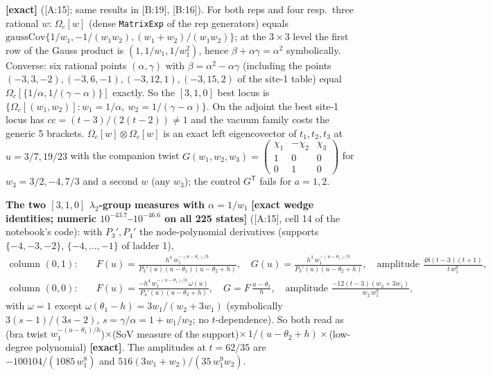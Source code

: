 \documentclass[10pt]{article}
\newcommand{\cl}[2]{\textsf{[#1:#2]}}
\newcommand{\tg}[1]{\textbf{[#1]}}
\newcommand{\Om}{\Omega}
\begin{document}
\tg{exact} (\cl{A}{15}; same results in \cl{B}{19}, \cl{B}{16}). For both reps and four resp.\ three rational $w$: $\Om_c[w]$ (dense \texttt{MatrixExp} of the rep generators) equals $\mathrm{gaussCov}\{1/w_1,-1/(w_1w_2),(w_1+w_2)/(w_1w_2)\}$; at the $3\times3$ level the first row of the Gauss product is $(1,1/w_1,1/w_1^2)$, hence $\beta+\alpha\gamma=\alpha^2$ symbolically. Converse: six rational points $(\alpha,\gamma)$ with $\beta=\alpha^2-\alpha\gamma$ (including the points $(-3,3,-2),(-3,6,-1),(-3,12,1),(-3,15,2)$ of the site-1 table) equal $\Om_c[\{1/\alpha,1/(\gamma-\alpha)\}]$ exactly. So the $[3,1,0]$ best locus is $\{\Om_c[(w_1,w_2)]:w_1=1/\alpha,\ w_2=1/(\gamma-\alpha)\}$. On the adjoint the best site-1 locus has $cc=(t-3)/(2(t-2))\neq1$ and the vacuum family costs the generic 5 brackets.
$\Om_c[w]\otimes\Om_c[w]$ is an exact left eigencovector of $t_1,t_2,t_3$ at $u=3/7,19/23$ with the companion twist $G(w_1,w_2,w_3)=\left(\begin{smallmatrix}\chi_1&-\chi_2&\chi_3\\1&0&0\\0&1&0\end{smallmatrix}\right)$ for $w_3=3/2,-4,7/3$ and a second $w$ (any $w_3$); the control $G^{\mathsf T}$ fails for $a=1,2$.

\textbf{The two $[3,1,0]$ $\lambda_2$-group measures with $\alpha=1/w_1$} \tg{exact wedge identities; numeric $10^{-43.7}$--$10^{-46.6}$ on all 225 states} (\cl{A}{15}, cell 14 of the notebook's code): with $P_3',P_4'$ the node-polynomial derivatives (supports $\{-4,-3,-2\}$, $\{-4,\dots,-1\}$ of ladder 1),
\begin{align*}
\text{column }(0,1):\quad & F(u)=\frac{h^4\,w_1^{-(u-\theta_1)/h}}{P_3'(u)(u-\theta_1)(u-\theta_2+h)},\quad G(u)=\frac{h^3\,w_1^{-(u-\theta_1)/h}}{P_3'(u)(u-\theta_2+h)},\quad \text{amplitude }\frac{48(t-3)(t+1)}{t\,w_1^{8}},\\
\text{column }(0,0):\quad & F(u)=\frac{-h^4\,w_1^{-(u-\theta_1)/h}\,\omega(u)}{P_4'(u)(u-\theta_2+h)},\quad G=F\,\frac{u-\theta_1}{h},\quad \text{amplitude }\frac{-12(t-3)(w_2+3w_1)}{w_2\,w_1^{9}},
\end{align*}
with $\omega=1$ except $\omega(\theta_1-h)=3w_1/(w_2+3w_1)$ (symbolically $3(s-1)/(3s-2)$, $s=\gamma/\alpha=1+w_1/w_2$; no $t$-dependence). So both read as (bra twist $w_1^{-(u-\theta_1)/h}$)$\times$(SoV measure of the support)$\times\,1/(u-\theta_2+h)\times$(low-degree polynomial) \tg{exact}. The amplitudes at $t=62/35$ are $-100104/(1085\,w_1^8)$ and $516(3w_1+w_2)/(35\,w_1^9w_2)$.
\end{document}

